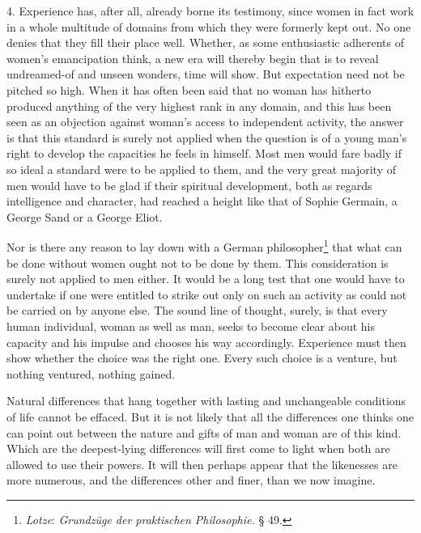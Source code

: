 \documentclass[12pt,a4paper,openany]{book}
\newcommand{\opage}[1]{\marginnote{\footnotesize\textit{[#1]}}}
\begin{document}
4. Experience has, after all, already borne its testimony, since women in fact work in a whole multitude of domains from
which they were formerly kept out. No one denies that they fill their place well. Whether, as some enthusiastic
adherents of women's emancipation think, a new era will thereby begin that is to reveal undreamed-of and unseen
wonders, time will show. But expectation need not be pitched so high. When it has often been said that no woman has
hitherto produced anything of the very highest rank in any domain, and this has been seen as an objection against
woman's access to independent activity, the answer is that this standard is surely not applied when the question is of a
young man's right to develop the capacities he feels in himself. Most men would fare badly if so ideal a standard were
to be applied to them, and the very great majority of men would have to be glad if their spiritual development, both as
regards intelligence and character, had reached a height like that of Sophie Germain, a George Sand or a George Eliot.

\opage{323}Nor is there any reason to lay down with a German philosopher\footnote[1]{\emph{Lotze}: \textit{Grundzüge der
praktischen Philosophie.} § 49.} that what can be done without women ought not to be done by them. This consideration is
surely not applied to men either. It would be a long test that one would have to undertake if one were entitled to
strike out only on such an activity as could not be carried on by anyone else. The sound line of thought, surely, is
that every human individual, woman as well as man, seeks to become clear about his capacity and his impulse and chooses
his way accordingly. Experience must then show whether the choice was the right one. Every such choice is a venture,
but nothing ventured, nothing gained.

Natural differences that hang together with lasting and unchangeable conditions of life cannot be effaced. But it is not
likely that all the differences one thinks one can point out between the nature and gifts of man and woman are of this
kind. Which are the deepest-lying differences will first come to light when both are allowed to use their powers. It
will then perhaps appear that the likenesses are more numerous, and the differences other and finer, than we now
imagine.
\end{document}
